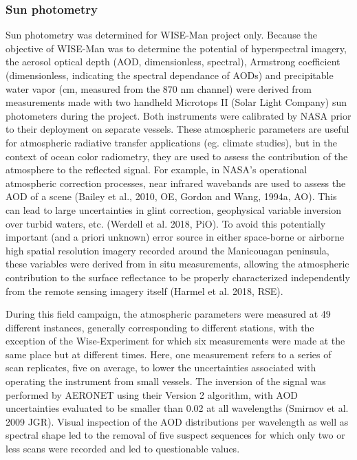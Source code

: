 \documentclass[essd, manuscript]{copernicus}
\begin{document}
\subsubsection{Sun photometry}
Sun photometry was determined for WISE-Man project only. Because the objective of WISE-Man was to determine the potential of hyperspectral imagery, the aerosol optical depth (AOD, dimensionless, spectral), Armstrong coefficient (dimensionless, indicating the spectral dependance of AODs) and precipitable water vapor (cm, measured from the 870 nm channel) were derived from measurements made with two handheld Microtops II (Solar Light Company) sun photometers during the project. Both instruments were calibrated by NASA prior to their deployment on separate vessels. These atmospheric parameters are useful for atmospheric radiative transfer applications (eg. climate studies), but in the context of ocean color radiometry, they are used to assess the contribution of the atmosphere to the reflected signal. For example, in NASA’s operational atmospheric correction processes, near infrared wavebands are used to assess the AOD of a scene (Bailey et al., 2010, OE, Gordon and Wang, 1994a, AO). This can lead to large uncertainties in glint correction, geophysical variable inversion over turbid waters, etc. (Werdell et al. 2018, PiO). To avoid this potentially important (and a priori unknown) error source in either space-borne or airborne high spatial resolution imagery recorded around the Manicouagan peninsula, these variables were derived from in situ measurements, allowing the atmospheric contribution to the surface reflectance to be properly characterized independently from the remote sensing imagery itself (Harmel et al. 2018, RSE).
 
During this field campaign, the atmospheric parameters were measured at 49 different instances, generally corresponding to different stations, with the exception of the Wise-Experiment for which six measurements were made at the same place but at different times. Here, one measurement refers to a series of scan replicates, five on average, to lower the uncertainties associated with operating the instrument from small vessels. The inversion of the signal was performed by AERONET using their Version 2 algorithm, with AOD uncertainties evaluated to be smaller than 0.02 at all wavelengths (Smirnov et al. 2009 JGR). Visual inspection of the AOD distributions per wavelength as well as spectral shape led to the removal of five suspect sequences for which only two or less scans were recorded and led to questionable values. 
\end{document}
